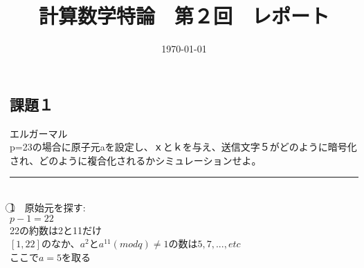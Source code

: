 \documentclass{article}
\author{}
\title{計算数学特論　第２回　レポート}
\date{\today}
\begin{document}
  \maketitle

\begin{spacing}{1.5}
\section{課題１}エルガーマル\\
p=23の場合に原子元aを設定し、ｘとｋを与え、送信文字５がどのように暗号化され、どのように複合化されるかシミュレーションせよ。\\
\hrule
~\\
\textcircled{1}　原始元を探す:\\
$p-1=22$\\
22の約数は2と11だけ\\
$[1,22]$のなか、$a^2$と$a^{11}(modq)\neq 1$の数は$5,7,...,etc$\\
ここで$a=5$を取る\\


\end{spacing}
\end{document}
